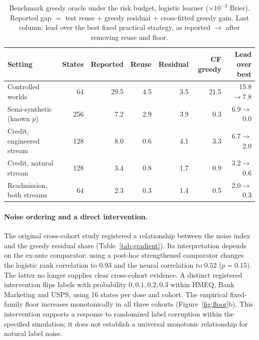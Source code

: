 \documentclass[runningheads]{llncs}
\begin{document}
\begin{table}[t]
\caption{Benchmark greedy oracle under the risk budget, logistic learner ($\times10^{-3}$ Brier). Reported gap $=$ test reuse $+$ greedy residual $+$ cross-fitted greedy gain. Last column: lead over the best fixed practical strategy, as reported $\to$ after removing reuse and floor.}
\label{tab:known}
\centering\scriptsize
\setlength{\tabcolsep}{3.5pt}
\begin{tabular}{lrrrrrr}
\toprule
Setting & States & Reported & Reuse & Residual & CF greedy & Lead over best \\
\midrule
Controlled worlds & 64 & 29.5 & 4.5 & 3.5 & 21.5 & 15.8$\to$7.8 \\
Semi-synthetic (known $p$) & 256 & 7.2 & 2.9 & 3.9 & 0.3 & 6.9$\to$0.0 \\
Credit, engineered stream & 128 & 8.0 & 0.6 & 4.1 & 3.3 & 6.7$\to$2.0 \\
Credit, natural stream & 128 & 3.4 & 0.8 & 1.7 & 0.9 & 3.2$\to$0.6 \\
Readmission, both streams & 64 & 2.3 & 0.3 & 1.4 & 0.5 & 2.0$\to$0.3 \\
\bottomrule
\end{tabular}
\end{table}

\paragraph{Noise ordering and a direct intervention.} The original cross-cohort study registered a relationship between the noise index and the greedy residual share (Table~\ref{tab:gradient}). Its interpretation depends on the ex-ante comparator: using a post-hoc strengthened comparator changes the logistic rank correlation to $0.93$ and the neural correlation to $0.52$ ($p=0.15$). The latter no longer supplies clear cross-cohort evidence. A distinct registered intervention flips labels with probability $0,0.1,0.2,0.3$ within HMEQ, Bank Marketing and USPS, using 16 states per dose and cohort. The empirical fixed-family floor increases monotonically in all three cohorts (Figure~\ref{fig:floor}b). This intervention supports a response to randomized label corruption within the specified simulation; it does not establish a universal monotonic relationship for natural label noise.
\end{document}
